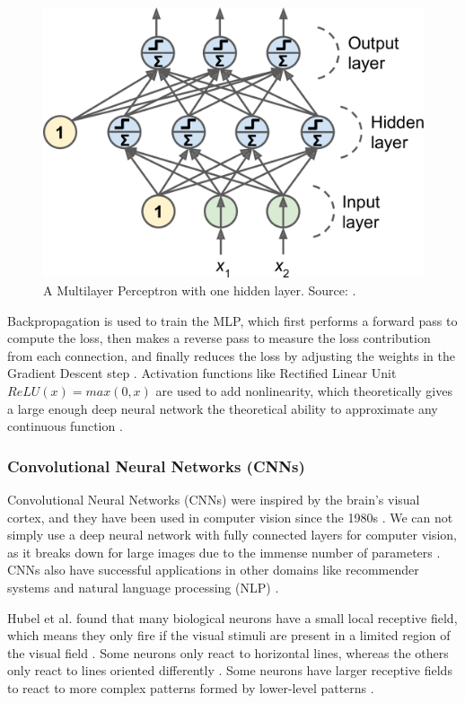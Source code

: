 \documentclass[a4paper, 11pt, oneside]{article}
\begin{document}
  \begin{figure}[ht]
    \begin{center}
      \includegraphics[width=.5\textwidth]{mlp.png}
    \end{center}
    \caption{A Multilayer Perceptron with one hidden layer. Source: \cite{geron2019hands}.}
  \end{figure}

  Backpropagation \cite{rumelhart1985learning} is used to train the MLP, which first performs a forward pass to compute
  the loss, then makes a reverse pass to measure the loss contribution from each connection, and finally reduces the
  loss by adjusting the weights in the Gradient Descent \cite{ruder2016overview} step \cite{geron2019hands}. Activation
  functions like Rectified Linear Unit $ReLU(x) = max(0, x)$ are used to add nonlinearity, which theoretically gives a
  large enough deep neural network the theoretical ability to approximate any continuous function \cite{geron2019hands}.

  \subsubsection{Convolutional Neural Networks (CNNs)}

  \label{sec:cnn}

  Convolutional Neural Networks (CNNs) \cite{lecun1989backpropagation} were inspired by the brain's visual cortex,
  and they have been used in computer vision since the 1980s \cite{geron2019hands}. We can not simply use a deep neural
  network with fully connected layers for computer vision, as it breaks down for large images due to the immense
  number of parameters \cite{geron2019hands}. CNNs also have successful applications in other domains like recommender
  systems \cite{van2013deep} and natural language processing (NLP) \cite{collobert2008unified}.

  Hubel et al. \cite{hubel1959single, hubel1959receptive, hubel1968receptive} found that many biological neurons have
  a small local receptive field, which  means they only fire if the visual stimuli are present in a limited region of
  the visual field \cite{geron2019hands}. Some neurons only react to horizontal lines, whereas the others only react to
  lines oriented differently \cite{geron2019hands}. Some neurons have larger receptive fields to react to more complex
  patterns formed by lower-level patterns \cite{geron2019hands}.
\end{document}
